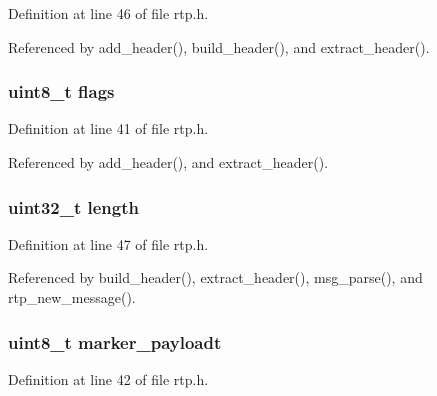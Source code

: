 Definition at line 46 of file rtp.\+h.



Referenced by add\+\_\+header(), build\+\_\+header(), and extract\+\_\+header().

\hypertarget{struct___r_t_p_header_aa2585d779da0ab21273a8d92de9a0ebe}{
\subsubsection[{flags}]{\setlength{\rightskip}{0pt plus 5cm}uint8\+\_\+t flags}}\label{struct___r_t_p_header_aa2585d779da0ab21273a8d92de9a0ebe}


Definition at line 41 of file rtp.\+h.



Referenced by add\+\_\+header(), and extract\+\_\+header().

\hypertarget{struct___r_t_p_header_aebb70c2aab3407a9f05334c47131a43b}{
\subsubsection[{length}]{\setlength{\rightskip}{0pt plus 5cm}uint32\+\_\+t length}}\label{struct___r_t_p_header_aebb70c2aab3407a9f05334c47131a43b}


Definition at line 47 of file rtp.\+h.



Referenced by build\+\_\+header(), extract\+\_\+header(), msg\+\_\+parse(), and rtp\+\_\+new\+\_\+message().

\hypertarget{struct___r_t_p_header_a18075763f8af96670c357b0322a71d96}{
\subsubsection[{marker\+\_\+payloadt}]{\setlength{\rightskip}{0pt plus 5cm}uint8\+\_\+t marker\+\_\+payloadt}}\label{struct___r_t_p_header_a18075763f8af96670c357b0322a71d96}


Definition at line 42 of file rtp.\+h.



